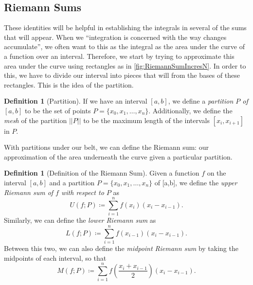 \documentclass[12pt]{article}
\newcommand{\abs}[1]{ \left| #1 \right| }
\theoremstyle{definition}
\newtheorem{defn}[thm]{Definition}
\theoremstyle{plain}
\numberwithin{equation}{section}
\begin{document}
\subsection{Riemann Sums}

These identities will be helpful in establishing the integrals in several of the sums that will appear. When we ``integration is concerned with the way changes accumulate'', we often want to this as the integral as the area under the curve of a function over an interval. Therefore, we start by trying to approximate this area under the curve using rectangles as in \cref{fig:RiemannSumIncresN}. In order to this, we have to divide our interval into pieces that will from the bases of these rectangles. This is the idea of the partition.
\begin{defn}[Partition]
If we have an interval $[a,b]$, we define a \emph{partition $P$ of $[a,b]$} to be the set of points $P=\{x_0,x_1,\dotsc, x_n\}$. Additionally, we define the \emph{mesh} of the partition $\abs{\abs{P}}$ to be the maximum length of the intervals $[x_i,x_{i+1}]$ in $P$.
\end{defn}

With partitions under our belt, we can define the Riemann sum: our approximation of the area underneath the curve given a particular partition.

\begin{defn}[Definition of the Riemann Sum]
  Given a function $f$ on the interval $[a,b]$ and a partition $P=\{x_0,x_1,\dotsc, x_n\}$ of [a,b], we define the \emph{upper Riemann sum of $f$ with respect to $P$} as
\begin{equation}
  U(f;P)\coloneqq\sum_{i=1}^{n}f(x_i)(x_i-x_{i-1}).
\end{equation}
Similarly, we can define the \emph{lower Riemann sum} as
\begin{equation}
  L(f;P)\coloneqq\sum_{i=1}^{n}f(x_{i-1})(x_i-x_{i-1}).
\end{equation}
Between this two, we can also define the \emph{ midpoint Riemann sum} by taking the midpoints of each interval, so that
\begin{equation}
  M(f;P)\coloneqq\sum_{i=1}^{n}f\left(\frac{x_{i}+x_{i-1}}{2}\right)(x_i-x_{i-1}).
\end{equation}
\end{defn}
\end{document}

